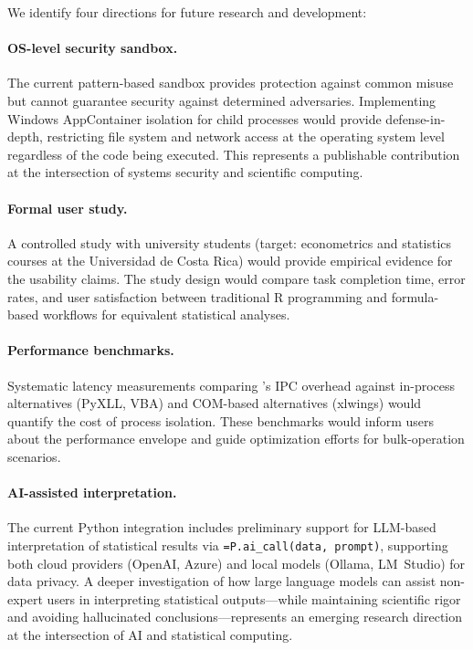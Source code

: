We identify four directions for future research and development:

\paragraph{OS-level security sandbox.} The current pattern-based sandbox provides protection against common misuse but cannot guarantee security against determined adversaries. Implementing Windows AppContainer isolation for child processes would provide defense-in-depth, restricting file system and network access at the operating system level regardless of the code being executed. This represents a publishable contribution at the intersection of systems security and scientific computing.

\paragraph{Formal user study.} A controlled study with university students (target: econometrics and statistics courses at the Universidad de Costa Rica) would provide empirical evidence for the usability claims. The study design would compare task completion time, error rates, and user satisfaction between traditional R programming and \neven{} formula-based workflows for equivalent statistical analyses.

\paragraph{Performance benchmarks.} Systematic latency measurements comparing \neven{}'s IPC overhead against in-process alternatives (PyXLL, VBA) and COM-based alternatives (xlwings) would quantify the cost of process isolation. These benchmarks would inform users about the performance envelope and guide optimization efforts for bulk-operation scenarios.

\paragraph{AI-assisted interpretation.} The current Python integration includes preliminary support for LLM-based interpretation of statistical results via \texttt{=P.ai\_call(data, prompt)}, supporting both cloud providers (OpenAI, Azure) and local models (Ollama, LM~Studio) for data privacy. A deeper investigation of how large language models can assist non-expert users in interpreting statistical outputs---while maintaining scientific rigor and avoiding hallucinated conclusions---represents an emerging research direction at the intersection of AI and statistical computing.

